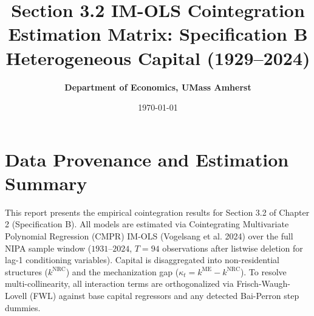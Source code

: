 \documentclass[11pt,a4paper]{article}
\title{\textbf{Section 3.2 IM-OLS Cointegration Estimation Matrix: Specification B Heterogeneous Capital (1929--2024)}}
\author{\textbf{Department of Economics, UMass Amherst}}
\date{\today}
\begin{document}
\maketitle

\section*{Data Provenance and Estimation Summary}
This report presents the empirical cointegration results for Section 3.2 of Chapter 2 (Specification B). All models are estimated via Cointegrating Multivariate Polynomial Regression (CMPR) IM-OLS (Vogelsang et al. 2024) over the full NIPA sample window ($1931$--$2024$, $T=94$ observations after listwise deletion for lag-1 conditioning variables). Capital is disaggregated into non-residential structures ($k^{\text{NRC}}$) and the mechanization gap ($\kappa_t = k^{\text{ME}} - k^{\text{NRC}}$). To resolve multi-collinearity, all interaction terms are orthogonalized via Frisch-Waugh-Lovell (FWL) against base capital regressors and any detected Bai-Perron step dummies.
\end{document}
